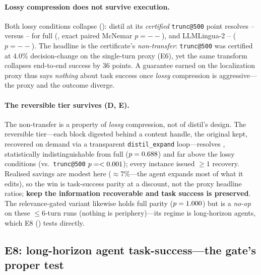 \documentclass{article}
\newcommand{\sweEsevenFullPass}{--}\newcommand{\sweEsevenFullResolved}{--}%
\newcommand{\sweEsevenDistilPass}{--}\newcommand{\sweEsevenDistilResolved}{--}%
\newcommand{\sweEsevenLinguaPass}{--}\newcommand{\sweEsevenLinguaResolved}{--}%
\newcommand{\sweEsevenDistilVsFullP}{--}\newcommand{\sweEsevenLinguaVsFullP}{--}%
\begin{document}
\paragraph{Lossy compression does not survive execution.} Both lossy conditions collapse
(): distil at its \emph{certified} \texttt{trunc@500} point resolves
\sweEsevenDistilPass{} versus \sweEsevenFullPass{} for full (\sweEsevenDistilDelta{}, exact
paired McNemar $p=\sweEsevenDistilVsFullP{}$), and LLMLingua-2 \sweEsevenLinguaPass{}
($p=\sweEsevenLinguaVsFullP{}$). The headline is the certificate's \emph{non-transfer}:
\texttt{trunc@500} was certified at $4.0\%$ decision-change on the single-turn proxy (E6),
yet the same transform collapses end-to-end success by $36$ points. A guarantee earned on the
localization proxy thus says \emph{nothing} about task success once \emph{lossy} compression
is aggressive---the proxy and the outcome diverge.

\paragraph{The reversible tier survives (D, E).} The non-transfer is a property of
\emph{lossy} compression, not of distil's design. The reversible tier---each block digested
behind a content handle, the original kept, recovered on demand via a transparent
\texttt{distil\_expand} loop---resolves \textbf{\sweEsevenExpandPass}, statistically
indistinguishable from full ($p=0.688{}$) and far above the lossy
conditions (vs.\ \texttt{trunc@500} $p=<0.001{}$); every instance issued
$\ge1$ recovery. Realised savings are modest here ($\approx$7\%---the agent expands most of
what it edits), so the win is task-success parity at a discount, not the proxy headline
ratios; \textbf{keep the information recoverable and task success is preserved}. The
relevance-gated variant likewise holds full parity ($p=1.000{}$) but is a
\emph{no-op} on these $\le$6-turn runs (nothing is periphery)---its regime is long-horizon
agents, which E8 () tests directly.

\subsection{E8: long-horizon agent task-success---the gate's proper test}
\label{sec:e8}
\end{document}
